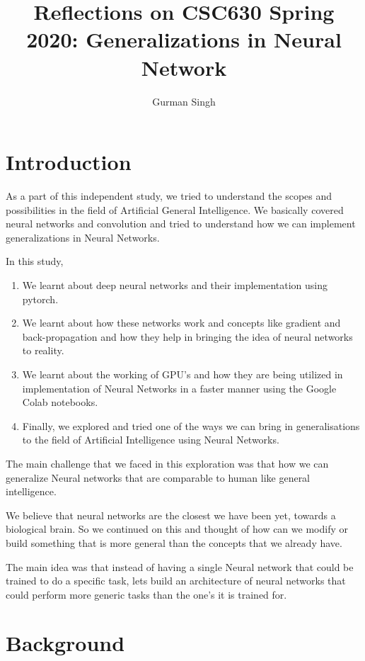 \documentclass[12pt]{acmart}
\title{Reflections on CSC630 Spring 2020: Generalizations in Neural Network}
\author{Gurman Singh}
\begin{document}
\maketitle

\section{Introduction}
As a part of this independent study, we tried to understand the scopes and possibilities in the field of Artificial General Intelligence. We basically covered neural networks and convolution and tried to understand how we can implement generalizations in Neural Networks.

In this study, 
\begin{enumerate}
    \item We learnt about deep neural networks and their implementation using pytorch\cite{pytorch}.
    \item We learnt about how these networks work and concepts like gradient and back-propagation and how they help in bringing the idea of neural networks to reality\cite{backpropagation}.
    \item We learnt about the working of GPU's and how they are being utilized in implementation of Neural Networks in a faster manner using the Google Colab notebooks\cite{colab}.
    \item Finally, we explored and tried one of the ways we can bring in generalisations to the field of Artificial Intelligence using Neural Networks.
\end{enumerate}

The main challenge that we faced in this exploration was that how we can generalize Neural networks that are comparable to human like general intelligence.

We believe that neural networks are the closest we have been yet, towards a biological brain. So we continued on this and thought of how can we modify or build something that is more general than the concepts that we already have.

The main idea was that instead of having a single Neural network that could be trained to do a specific task, lets build an architecture of neural networks that could perform more generic tasks than the one's it is trained for.

\section{Background}
\end{document}
